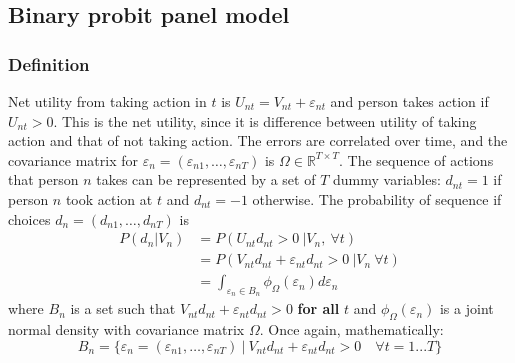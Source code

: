 \documentclass[11pt,a4paper]{article}
\begin{document}
\subsection*{Binary probit panel model}
\subsubsection*{Definition}
Net utility from taking action in $ t $ is
$ U_{nt} = V_{nt} + \varepsilon_{nt} $ and person takes action
if $ U_{nt}> 0 $. This is the net utility, since it is difference
between utility of taking action and that of not taking action.
The errors are correlated over time, and the covariance matrix
for $ \varepsilon_{n} = (\varepsilon_{n1}, \dots, \varepsilon_{nT}) $
is $ \Omega\in\mathbb{R}^{T\times T} $. The sequence of actions
that person $ n $ takes can be represented by a set of $ T $ dummy
variables: $ d_{nt} = 1 $ if person $ n $ took action at $ t $ and
$ d_{nt} = -1 $ otherwise. The probability of sequence if choices
$ d_n = (d_{n1}, \dots, d_{nT}) $ is
\begin{align*}
    P(d_n| V_n) & = P(U_{nt}d_{nt}>0~|V_n,~ \forall t)                                      \\
                & = P(V_{nt}d_{nt} + \varepsilon_{nt}d_{nt} > 0 ~|V_n~\forall t)            \\
                & = \int_{\varepsilon_n \in B_n} \phi_{\Omega}(\varepsilon_n)d\varepsilon_n
\end{align*}
where $ B_n $ is a set such that $ V_{nt}d_{nt} + \varepsilon_{nt}d_{nt} > 0 $
\textbf{for all} $ t $ and $ \phi_{\Omega}(\varepsilon_n)  $ is a joint
normal density with covariance matrix $ \Omega $. Once again,
mathematically:
$$ B_n = \{ \varepsilon_n = (\varepsilon_{n1}, \dots, \varepsilon_{nT}) ~|~V_{nt}d_{nt} + \varepsilon_{nt}d_{nt} > 0 \quad \forall t = 1...T\} $$
\end{document}
